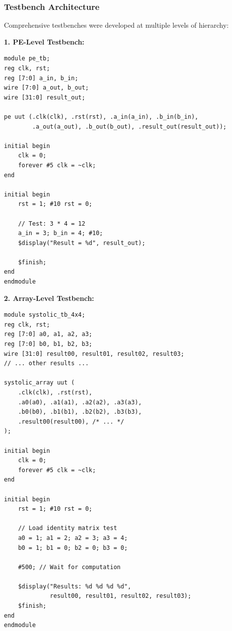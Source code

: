 \documentclass[12pt,a4paper]{article}
\begin{document}
\subsubsection{Testbench Architecture}

Comprehensive testbenches were developed at multiple levels of hierarchy:

\textbf{1. PE-Level Testbench:}
\begin{lstlisting}[style=verilog,caption={PE Module Testbench (Excerpt)},label={lst:pe_tb}]
module pe_tb;
reg clk, rst;
reg [7:0] a_in, b_in;
wire [7:0] a_out, b_out;
wire [31:0] result_out;

pe uut (.clk(clk), .rst(rst), .a_in(a_in), .b_in(b_in),
        .a_out(a_out), .b_out(b_out), .result_out(result_out));

initial begin
    clk = 0;
    forever #5 clk = ~clk;
end

initial begin
    rst = 1; #10 rst = 0;
    
    // Test: 3 * 4 = 12
    a_in = 3; b_in = 4; #10;
    $display("Result = %d", result_out);
    
    $finish;
end
endmodule
\end{lstlisting}

\newpage

\textbf{2. Array-Level Testbench:}
\begin{lstlisting}[style=verilog,caption={Systolic Array Testbench (Excerpt)},label={lst:array_tb}]
module systolic_tb_4x4;
reg clk, rst;
reg [7:0] a0, a1, a2, a3;
reg [7:0] b0, b1, b2, b3;
wire [31:0] result00, result01, result02, result03;
// ... other results ...

systolic_array uut (
    .clk(clk), .rst(rst),
    .a0(a0), .a1(a1), .a2(a2), .a3(a3),
    .b0(b0), .b1(b1), .b2(b2), .b3(b3),
    .result00(result00), /* ... */
);

initial begin
    clk = 0;
    forever #5 clk = ~clk;
end

initial begin
    rst = 1; #10 rst = 0;
    
    // Load identity matrix test
    a0 = 1; a1 = 2; a2 = 3; a3 = 4;
    b0 = 1; b1 = 0; b2 = 0; b3 = 0;
    
    #500; // Wait for computation
    
    $display("Results: %d %d %d %d", 
             result00, result01, result02, result03);
    $finish;
end
endmodule
\end{lstlisting}

\newpage
\end{document}

